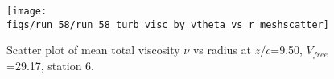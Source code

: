 \begin{figure}[H]
\centering
\texttt{[image: figs/run\_58/run\_58\_turb\_visc\_by\_vtheta\_vs\_r\_meshscatter]}
\caption{Scatter plot of mean total viscosity $\nu$ vs radius at $z/c$=9.50, $V_{free}$=29.17, station 6.}
\label{fig:run_58_turb_visc_by_vtheta_vs_r_meshscatter}
\end{figure}


